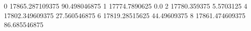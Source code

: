 0 17865.287109375 90.498046875
1 17774.7890625 0.0
2 17780.359375 5.5703125
4 17802.349609375 27.560546875
6 17819.28515625 44.49609375
8 17861.474609375 86.685546875
